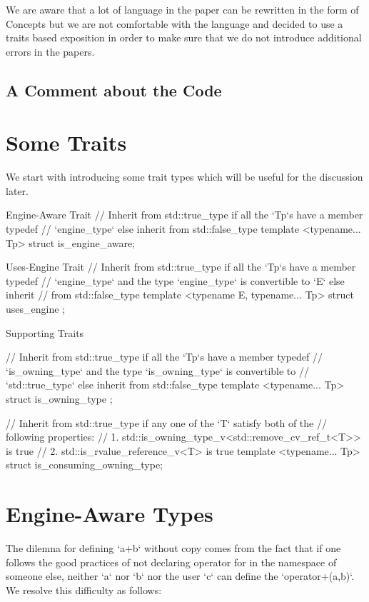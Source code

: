 \documentclass[oneside,11pt,a4paper]{jbarticle}
\begin{document}
We are aware that a lot of language in the paper can be rewritten in the
form of Concepts but we are not comfortable with the language and decided to use
a traits based exposition in order to make sure that we do not introduce
additional errors in the papers.

\subsection{A Comment about the Code}

\section{Some Traits}
We start with introducing some trait types which will be useful for the
discussion later.

\begin{codecpp}{Engine-Aware Trait}
// Inherit from std::true_type if all the `Tp`s have a member typedef
// `engine_type` else inherit from std::false_type
template <typename... Tp>
struct is_engine_aware;
\end{codecpp}

\begin{codecpp}{Uses-Engine Trait}
// Inherit from std::true_type if all the `Tp`s have a member typedef
// `engine_type` and the type `engine_type` is convertible to `E` else inherit
// from std::false_type
template <typename E, typename... Tp>
struct uses_engine ;
\end{codecpp}



\begin{codecpp}{Supporting Traits}


// Inherit from std::true_type if all the `Tp`s have a member typedef
// `is_owning_type` and the type `is_owning_type` is convertible to
// `std::true_type` else inherit from std::false_type
template <typename... Tp>
struct is_owning_type ;

// Inherit from std::true_type if any one of the `T` satisfy both of the
// following properties:
// 1. std::is_owning_type_v<std::remove_cv_ref_t<T>> is true
// 2. std::is_rvalue_reference_v<T> is true
template <typename... Tp>
struct is_consuming_owning_type;
\end{codecpp}



\section{Engine-Aware Types}
The dilemna for defining `a+b` without copy comes from the fact that if one
follows the good practices of not declaring operator for in the namespace of
someone else, neither `a` nor `b` nor the user `c` can define the
`operator+(a,b)`. We resolve this difficulty as follows:
\end{document}
